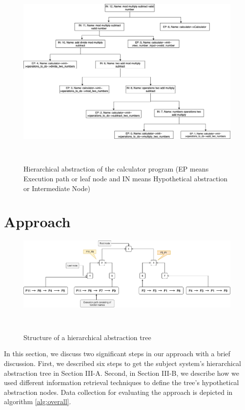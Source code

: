 \begin{figure}[tb]
  \centering
  \includegraphics[width=\columnwidth]{figures/hla2/motivation_n.png}
  \caption{Hierarchical abstraction of the calculator program (EP means Execution path or leaf node and IN means Hypothetical abstraction or Intermediate Node)}~\label{fig:motivation}
\end{figure}

\section{Approach}
\label{approach}
\begin{figure}[tb]
  \centering
  \includegraphics[width=\columnwidth]{figures/hla2/tree_structure.png}
  \caption{Structure of a hierarchical abstraction tree}~\label{fig:tree_structure}
\end{figure}
In this section, we discuss two significant steps in our approach with a brief discussion. First, we described six steps to get the subject system's hierarchical abstraction tree in Section III-A. Second, in Section III-B, we describe how we used different information retrieval techniques to define the tree's hypothetical abstraction nodes. Data collection for evaluating the approach is depicted in algorithm \ref{alg:overall}.


